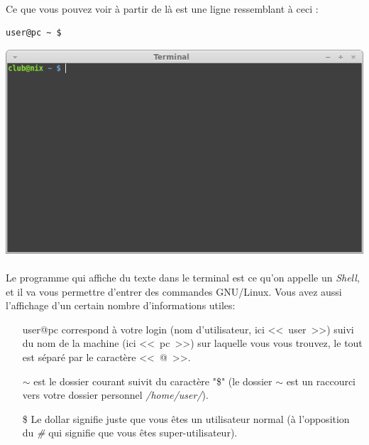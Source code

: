 \documentclass[french, a4paper, 12pt, titlepage]{article}
\begin{document}
\paragraph{} Ce que vous pouvez voir à partir de là est une ligne ressemblant à
ceci :
\begin{lstlisting}
user@pc ~ $
\end{lstlisting}


\begin{center}
	\includegraphics[scale=0.42]{Images/terminal}
\end{center}

\paragraph{} Le programme qui affiche du texte dans le terminal est ce qu'on
appelle un \emph{Shell}, et il va vous permettre d'entrer des commandes
GNU/Linux. Vous avez aussi l'affichage d'un certain nombre d'informations
utiles:

\begin{enumerate}
	\item[user@pc] correspond à votre login (nom d'utilisateur, ici
		<<~user~>>) suivi du nom de la machine (ici <<~pc~>>) sur laquelle
		vous vous trouvez, le tout est séparé par le caractère <<~@~>>.
	\item[$\sim$] est le dossier courant suivit du caractère "\$"
		(le dossier $\sim$ est un raccourci vers votre dossier personnel
		\emph{/home/user/}).
	\item[\$] Le dollar signifie juste que vous êtes un utilisateur normal (à
		l'opposition du \emph{\#} qui signifie que vous êtes
		super-utilisateur).
\end{enumerate}
\end{document}
